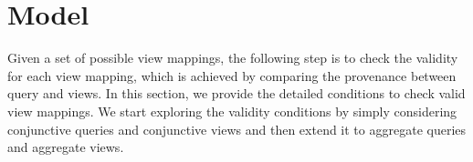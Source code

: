 \section{Model}\label{sec:model}



Given a set of possible view mappings, the following step is to check the validity for each view mapping, which is achieved by comparing the provenance between query and views. In this section, we provide the detailed conditions to check valid view mappings. We start exploring the validity conditions by simply considering conjunctive queries and conjunctive views and then extend it to aggregate queries and aggregate views. 

